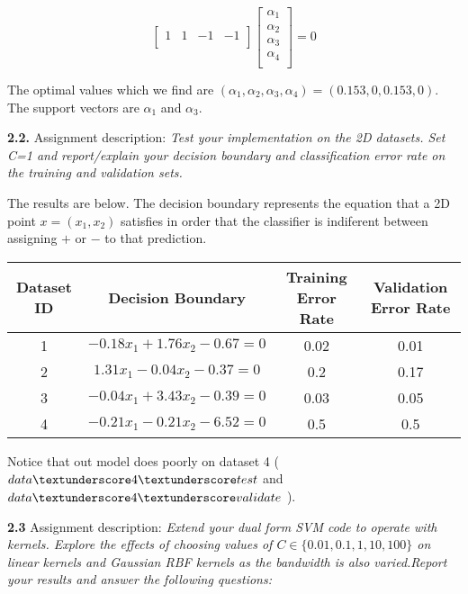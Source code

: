 \documentclass[10pt]{article}
\newcommand{\ds}{\displaystyle}
\begin{document}
\[
\begin{bmatrix}
    1 & 1 & -1 & -1 \\
\end{bmatrix}
\begin{bmatrix}
    \alpha_1 \\
    \alpha_2 \\
    \alpha_3 \\
    \alpha_4 \\
\end{bmatrix} 
= 0
\]

The optimal values which we find are $\ds (\alpha_1, \alpha_2, \alpha_3, \alpha_4) = (0.153, 0, 0.153, 0)$. The support vectors are $\ds \alpha_1$ and $\ds\alpha_3$.

\medskip

\textbf{2.2.} Assignment description: \emph{Test your implementation on the 2D datasets. Set C=1 and report/explain your decision boundary and classification error rate on the training and validation sets.}

The results are below. The decision boundary represents the equation that a 2D point $\ds x=(x_1, x_2)$ satisfies in order that the classifier is indiferent between assigning $\ds +$ or $\ds -$ to that prediction.

\begin{center}
 \begin{tabular}{||c c c c||} 
 \hline
 Dataset ID & Decision Boundary & Training Error Rate & Validation Error Rate \\ [0.5ex] 
 \hline\hline
 1 & $\ds -0.18 x_1 + 1.76 x_2 - 0.67 =0$ & 0.02 & 0.01 \\ 
 \hline
 2 & $\ds 1.31 x_1 -0.04 x_2-0.37=0$ & 0.2 & 0.17 \\
 \hline
 3 & $\ds -0.04 x_1 + 3.43x_2 -0.39 =0$ & 0.03 & 0.05 \\
 \hline
 4 & $\ds -0.21x_1 - 0.21 x_2 - 6.52 =0$ & 0.5 & 0.5 \\
 \hline
\end{tabular}
\end{center}

Notice that out model does poorly on dataset 4 ($\ds data\textunderscore 4\textunderscore test$ and $\ds data\textunderscore 4\textunderscore validate$ ).

\medskip
\textbf{2.3} Assignment description: \emph{Extend your dual form SVM code to operate
with kernels. Explore the effects of choosing values of $\ds C\in \{0.01, 0.1, 1, 10, 100\}$ on linear kernels and Gaussian RBF kernels as the bandwidth is also varied.Report your results and answer the following questions:}
\end{document}
